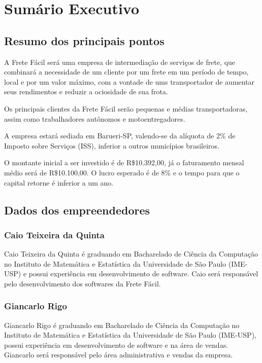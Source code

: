 \chapter{Sumário Executivo}\label{sumario}

\section{Resumo dos principais pontos}
  A Frete Fácil será uma empresa de intermediação de serviços de frete, que combinará a necessidade de um cliente por um frete em um período de tempo, local e por um valor máximo, com a vontade de ums transportador de aumentar seus rendimentos e reduzir a ociosidade de sua frota.
\newline

Os principais clientes da Frete Fácil serão pequenas e médias transportadoras, assim como trabalhadores autônomos e motoentregadores.\newline

A empresa estará sediada em Barueri-SP, valendo-se da alíquota de 2\% de Imposto sobre Serviços (ISS), inferior a outros municípios brasileiros.\newline

O montante inicial a ser investido é de R\$10.392,00, já o faturamento mensal médio será de R\$10.100,00.
O lucro esperado é de 8\% e o tempo para que o capital retorne é inferior a um ano.\newline

\section{Dados dos empreendedores}
\subsection{Caio Teixeira da Quinta}
  Caio Teixeira da Quinta é graduando em Bacharelado de Ciência da Computação no Instituto de Matemática e Estatística da Universidade de São Paulo (IME-USP) e possui experiência em desenvolvimento de software. Caio será responsável pelo desenvolvimento dos softwares da Frete Fácil.

\subsection{Giancarlo Rigo}
  Giancarlo Rigo é graduando em Bacharelado de Ciência da Computação no Instituto de Matemática e Estatística da Universidade de São Paulo (IME-USP), possui experiência em desenvolvimento de software e na área de vendas. Giancarlo será responsável pelo área administrativa e vendas da empresa.

